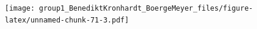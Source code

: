 \documentclass[
  11pt,
  a4paper,
  twoside]{scrbook}
\newenvironment{Shaded}{\begin{snugshade}}{\end{snugshade}}
\newcommand{\FunctionTok}[1]{\textcolor[rgb]{0.00,0.00,0.00}{#1}}
\newcommand{\NormalTok}[1]{#1}
\newcommand{\SpecialCharTok}[1]{\textcolor[rgb]{0.00,0.00,0.00}{#1}}
\begin{document}
\linespread{1}

\begin{Shaded}
\end{Shaded}

\linespread{1}\texttt{[image: group1\_BenediktKronhardt\_BoergeMeyer\_files/figure-latex/unnamed-chunk-71-3.pdf]}



\doublespacing
\end{document}
